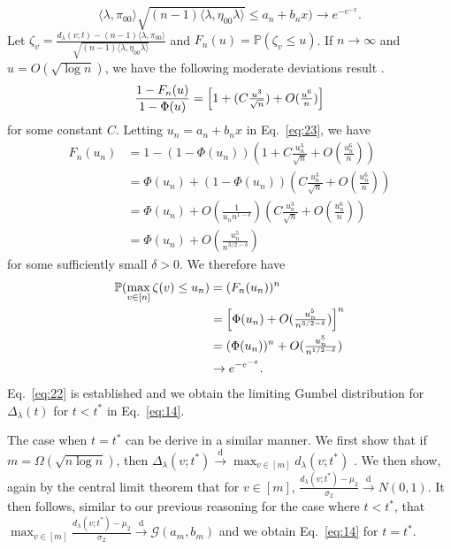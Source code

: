 \documentclass[10pt,journal,compsoc]{IEEEtran}
\theoremstyle{definition}
\begin{document}
\begin{IEEEproof}
\begin{equation}
{      \langle \lambda, \pi_{00} \rangle}{\sqrt{(n-1) \langle
        \lambda, \eta_{00} \lambda \rangle}} \leq a_n + b_n x\Big)
    \rightarrow 
    e^{-e^{-x}}. 
  \end{equation}
  Let $\zeta_v = \tfrac{d_{\lambda}(v;t) - (n-1) \langle \lambda,
    \pi_{00} \rangle}{\sqrt{(n-1) \langle \lambda, \eta_{00} \lambda
      \rangle}}$ and $F_n(u) = \mathbb{P}(\zeta_v \leq u)$. If $n
  \rightarrow \infty$ and $u = O(\sqrt{\log{n}})$, we have the
  following moderate deviations result \cite[Theorem~2, \S
  XVI.7]{feller71:_introd_probab_theor_its_applic,rubin65:_probab}.
  \begin{equation}
    \label{eq:23}
    \frac{1 - F_{n}(u)}{1 - \Phi(u)} = \Bigl[1 + (C\tfrac{u^{3}}{\sqrt{n}}) + O(\tfrac{u^{6}}{n}) \Bigr]
  \end{equation}
  for some constant $C$. Letting $u_n = a_n + b_n x$ in
  Eq.~\eqref{eq:23}, we have
  \begin{equation*}
    \begin{split}
      F_n(u_n) &= 1 - (1 - \Phi(u_n))(1 + C \tfrac{u_n^{3}}{\sqrt{n}} +
      O(\tfrac{u_n^{6}}{n})) \\
      &= \Phi(u_n) + (1 - \Phi(u_n))(C \tfrac{u_n^{3}}{\sqrt{n}} +
      O(\tfrac{u_n^6}{n})) \\
      &= \Phi(u_n) + O(\tfrac{1}{u_n n^{1- \delta}})(C \tfrac{u_n^{3}}{\sqrt{n}} +
      O(\tfrac{u_n^6}{n})) \\
      &= \Phi(u_n) + O(\tfrac{u_n^{5}}{n^{3/2 - \delta}})
    \end{split}
  \end{equation*}
  for some sufficiently small $\delta > 0$. We therefore have
  \begin{equation}
    \label{eq:25}
    \begin{split}
      \mathbb{P}(\max_{v \in [n]} \zeta(v) \leq u_n) &= (F_n(u_n))^{n} \\
      &= \Bigl[\Phi(u_n) + O(\tfrac{u_n^{5}}{n^{3/2 - \delta}})\Bigr]^{n} \\
      &= (\Phi(u_n))^{n} + O(\tfrac{u_n^{5}}{n^{1/2 - \delta}}) \\
      & \rightarrow e^{-e^{-x}}. 
    \end{split}
  \end{equation}
  Eq.~\eqref{eq:22} is established and we obtain the limiting Gumbel distribution for
  $\Delta_{\lambda}(t)$ for $t < t^{*}$ in Eq.~\eqref{eq:14}.
  
  The case when $t = t^{*}$ can be
  derive in a similar manner. We first show that if $m =
  \Omega(\sqrt{n \log{n}})$, then $\Delta_{\lambda}(v;t^{*})
  \overset{\mathrm{d}}{\longrightarrow} \max_{v \in [m]}{d_{\lambda}(v;t^{*})}$ \cite[Lemma
  3.1]{rukhin:_limit_distr_graph_scan_statis}.  
  We then show, again by the 
  central limit theorem that for $v \in [m]$, $\tfrac{d_{\lambda}(v;t^{*}) -
    \mu_2}{\sigma_2} \overset{\mathrm{d}}{\longrightarrow} N(0,1)$. It then follows, similar
  to our previous reasoning for the case where $t < t^{*}$, that
  $\max_{v \in [m]} \tfrac{d_{\lambda}(v;t^{*}) -
    \mu_2}{\sigma_2} \overset{\mathrm{d}}{\longrightarrow}\mathcal{G}(a_m,b_m)$ and we obtain
  Eq.~\eqref{eq:14} for $t = t^{*}$.  
\end{IEEEproof}
\end{document}
